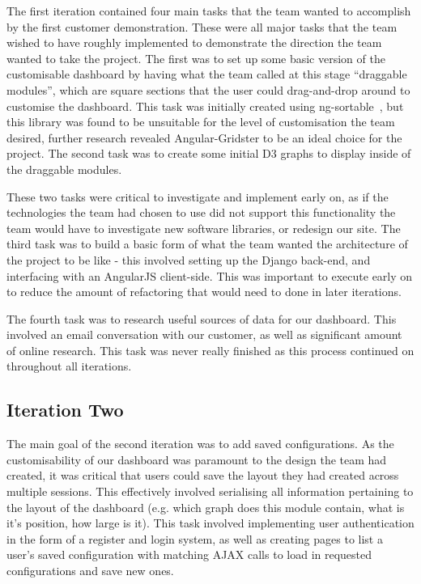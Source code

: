 \documentclass{l3proj}
\begin{document}
The first iteration contained four main tasks that the team wanted to accomplish by the first customer demonstration. These were all major tasks that the team wished to have roughly implemented to demonstrate the direction the team wanted to take the project. The first was to set up some basic version of the customisable dashboard by having what the team called at this stage ``draggable modules'', which are square sections that the user could drag-and-drop around to customise the dashboard. This task was initially created using ng-sortable~\cite{NGSortable}, but this library was found to be unsuitable for the level of customisation the team desired, further research revealed Angular-Gridster to be an ideal choice for the project. The second task was to create some initial D3 graphs to display inside of the draggable modules.

These two tasks were critical to investigate and implement early on, as if the technologies the team had chosen to use did not support this functionality the team would have to investigate new software libraries, or redesign our site. The third task was to build a basic form of what the team wanted the architecture of the project to be like - this involved setting up the Django back-end, and interfacing with an AngularJS client-side. This was important to execute early on to reduce the amount of refactoring that would need to done in later iterations.

The fourth task was to research useful sources of data for our dashboard. This involved an email conversation with our customer, as well as significant amount of online research. This task was never really finished as this process continued on throughout all iterations.

\subsection{Iteration Two}
\label{sec:development:iteration-Two}

The main goal of the second iteration was to add saved configurations. As the customisability of our dashboard was paramount to the design the team had created, it was critical that users could save the layout they had created across multiple sessions. This effectively involved serialising all information pertaining to the layout of the dashboard (e.g. which graph does this module contain, what is it's position, how large is it). This task involved implementing user authentication in the form of a register and login system, as well as creating pages to list a user's saved configuration with matching AJAX calls to load in requested configurations and save new ones.
\end{document}
